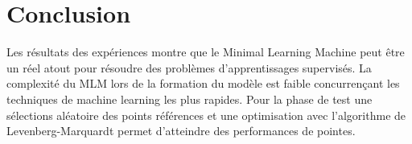 \documentclass[12pt,a4paper]{report}
\begin{document}
\chapter{Conclusion}

\par Les résultats des expériences montre que le Minimal Learning Machine peut être un réel atout pour résoudre des problèmes d'apprentissages supervisés. La complexité du MLM lors de la formation du modèle est faible concurrençant les techniques de machine learning les plus rapides. Pour la phase de test une sélections aléatoire des points références et une optimisation avec l'algorithme de Levenberg-Marquardt permet d'atteindre des performances de pointes.\\
\end{document}
